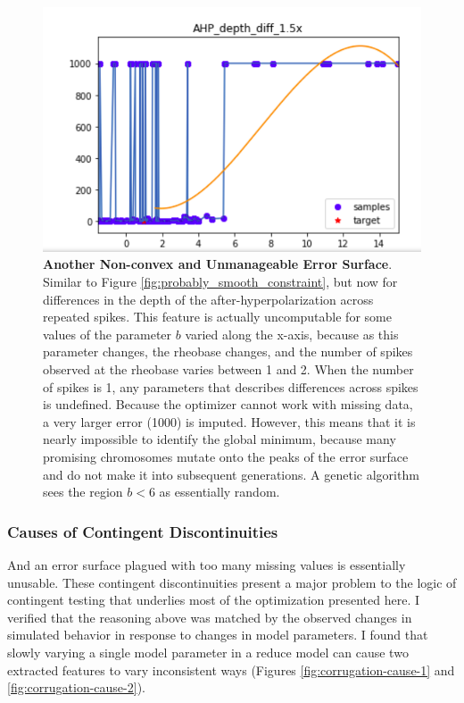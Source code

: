 \begin{figure}
      \centering
      \includegraphics[scale=0.85]{figures/parameter_b_hopeless_surface2.png}
      \caption[A Non-convex and Unmanageable Error Surface (2)]{\textbf{Another Non-convex and Unmanageable Error Surface}. Similar to Figure  \ref{fig:probably_smooth_constraint}, but now for differences in the depth of the after-hyperpolarization across repeated spikes.
      This feature is actually uncomputable for some values of the parameter $b$ varied along the x-axis, because as this parameter changes, the rheobase changes, and the number of spikes observed at the rheobase varies between 1 and 2.
      When the number of spikes is 1, any parameters that describes differences across spikes is undefined.
      Because the optimizer cannot work with missing data, a very larger error (1000) is imputed.
      However, this means that it is nearly impossible to identify the global minimum, because many promising chromosomes mutate onto the peaks of the error surface and do not make it into subsequent generations.
      A genetic algorithm sees the region $b<6$ as essentially random.}
      \label{fig:discontinuous_constraint}
\end{figure}

\subsubsection{Causes of Contingent Discontinuities}
And an error surface plagued with too many missing values is essentially unusable.
These contingent discontinuities present a major problem to the logic of contingent testing that underlies most of the optimization presented here.
I verified that the reasoning above was matched by the observed changes in simulated behavior in response to changes in model parameters.
I found that slowly varying a single model parameter in a reduce model can cause two extracted features to vary inconsistent ways (Figures \ref{fig:corrugation-cause-1} and \ref{fig:corrugation-cause-2}).


